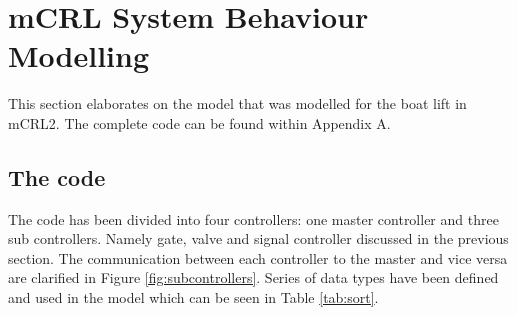 \section{mCRL System Behaviour Modelling}
This section elaborates on the model that was modelled for the boat lift in mCRL2. The complete code can be found within Appendix A.
\subsection{The code}
The code has been divided into four controllers: one master controller and three sub controllers. Namely gate, valve and signal controller discussed in the previous section. The communication between each controller to the master and vice versa are clarified in Figure \ref{fig:subcontrollers}.
Series of data types have been defined and used in the model which can be seen in Table \ref{tab:sort}.


